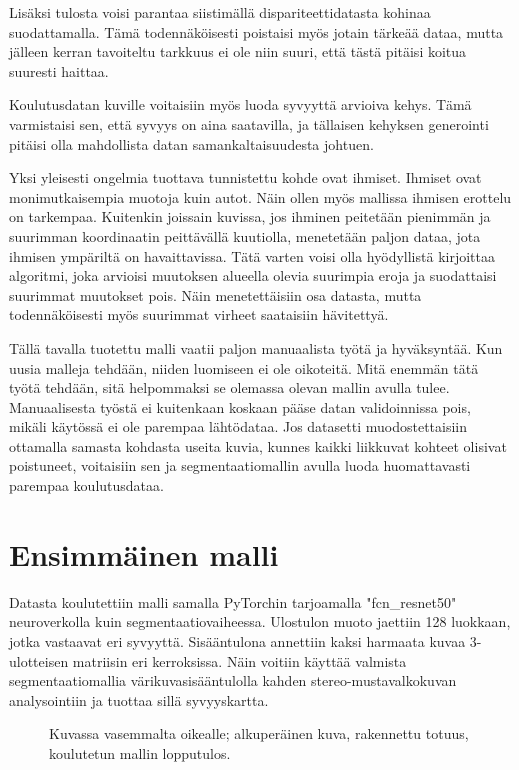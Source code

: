 Lisäksi tulosta voisi parantaa siistimällä dispariteettidatasta kohinaa suodattamalla.
Tämä todennäköisesti poistaisi myös jotain tärkeää dataa,
mutta jälleen kerran tavoiteltu tarkkuus ei ole niin suuri, että tästä pitäisi koitua suuresti haittaa.

Koulutusdatan kuville voitaisiin myös luoda syvyyttä arvioiva kehys.
Tämä varmistaisi sen, että syvyys on aina saatavilla, 
ja tällaisen kehyksen generointi pitäisi olla mahdollista datan samankaltaisuudesta johtuen.

Yksi yleisesti ongelmia tuottava tunnistettu kohde ovat ihmiset.
Ihmiset ovat monimutkaisempia muotoja kuin autot.
Näin ollen myös mallissa ihmisen erottelu on tarkempaa.
Kuitenkin joissain kuvissa,
jos ihminen peitetään pienimmän ja suurimman koordinaatin peittävällä kuutiolla,
menetetään paljon dataa, jota ihmisen ympäriltä on havaittavissa.
Tätä varten voisi olla hyödyllistä kirjoittaa algoritmi, joka arvioisi muutoksen alueella olevia suurimpia eroja ja suodattaisi suurimmat muutokset pois.
Näin menetettäisiin osa datasta,
mutta todennäköisesti myös suurimmat virheet saataisiin hävitettyä. 

Tällä tavalla tuotettu malli vaatii paljon manuaalista työtä ja hyväksyntää.
Kun uusia malleja tehdään, niiden luomiseen ei ole oikoteitä.
Mitä enemmän tätä työtä tehdään,
sitä helpommaksi se olemassa olevan mallin avulla tulee.
Manuaalisesta työstä ei kuitenkaan koskaan pääse datan validoinnissa pois,
mikäli käytössä ei ole parempaa lähtödataa.
Jos datasetti muodostettaisiin ottamalla samasta kohdasta useita kuvia,
kunnes kaikki liikkuvat kohteet olisivat poistuneet,
voitaisiin sen ja segmentaatiomallin avulla luoda huomattavasti parempaa koulutusdataa. 

\section{Ensimmäinen malli}

Datasta koulutettiin malli samalla PyTorchin tarjoamalla "fcn\_resnet50" \cite{pytorchfcnresnet50} neuroverkolla kuin segmentaatiovaiheessa.
Ulostulon muoto jaettiin 128 luokkaan, jotka vastaavat eri syvyyttä.
Sisääntulona annettiin kaksi harmaata kuvaa 3-ulotteisen matriisin eri kerroksissa.
Näin voitiin käyttää valmista segmentaatiomallia värikuvasisääntulolla kahden stereo-mustavalkokuvan analysointiin ja tuottaa sillä syvyyskartta.

\begin{figure}[h]
\centering
{}
\caption{Kuvassa vasemmalta oikealle; alkuperäinen kuva, rakennettu totuus, koulutetun mallin lopputulos.}
\label{fig:model}
\end{figure}

